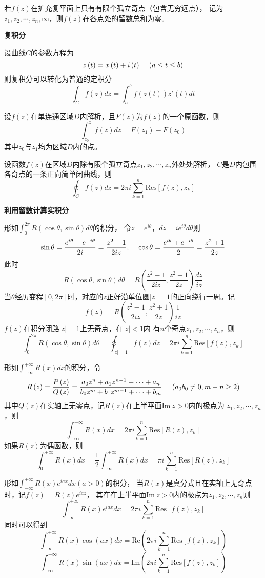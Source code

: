 \documentclass[a4paper,12pt]{article}
\begin{document}
若$f\left(z\right)$在扩充复平面上只有有限个孤立奇点（包含无穷远点），
记为$z_1,z_2,\cdots,z_n,\infty$，则$f\left(z\right)$在各点处的留数总和为零。

\noindent
\textbf{复积分}

设曲线$C$的参数方程为
$$
z\left(t\right)=x\left(t\right)+i\left(t\right)\kern 12pt\left(a\le t\le b\right)
$$
则复积分可以转化为普通的定积分
$$
\int_Cf\left(z\right)dz=\int_a^bf\left(z\left(t\right)\right)z'\left(t\right)dt
$$

设$f\left(z\right)$在单连通区域$D$内解析，且$F\left(z\right)$为$f\left(z\right)$的一个原函数，则
$$
\int_{z_0}^{z_1}f\left(z\right)dz=F\left(z_1\right)-F\left(z_0\right)
$$
其中$z_0$与$z_1$均为区域$D$内的点。

设函数$f\left(z\right)$在区域$D$内除有限个孤立奇点$z_1,z_2,\cdots,z_n$外处处解析，
$C$是$D$内包围各奇点的一条正向简单闭曲线，则
$$
\oint_Cf\left(z\right)dz=2\pi i\sum_{k=1}^n\text{Res}\left[f\left(z\right),z_k\right]
$$

\noindent
\textbf{利用留数计算实积分}

形如$\int_0^{2\pi}R\left(\cos\theta,\sin\theta\right)d\theta$的积分，
令$z=e^{i\theta}$，$dz=ie^{i\theta}d\theta$则
$$
\sin\theta=\frac{e^{i\theta}-e^{-i\theta}}{2i}=\frac{z^2-1}{2iz},\kern 12pt
\cos\theta=\frac{e^{i\theta}+e^{-i\theta}}{2}=\frac{z^2+1}{2z}
$$
此时
$$
R\left(\cos\theta,\sin\theta\right)d\theta=
R\left(\frac{z^2-1}{2iz},\frac{z^2+1}{2z}\right)\frac{dz}{iz}
$$
当$\theta$经历变程$\left[0,2\pi\right]$时，对应的$z$正好沿单位圆$\left|z\right|=1$的正向绕行一周。记
$$
f\left(z\right)=R\left(\frac{z^2-1}{2iz},\frac{z^2+1}{2z}\right)\frac1{iz}
$$
$f\left(z\right)$在积分闭路$\left|z\right|=1$上无奇点，在$\left|z\right|<1$内
有$n$个奇点$z_1,z_2,\cdots,z_n$，则
$$
\int_0^{2\pi}R\left(\cos\theta,\sin\theta\right)d\theta=
\oint_{\left|z\right|=1}f\left(z\right)dz=
2\pi i\sum_{k=1}^n\text{Res}\left[f\left(z\right),z_k\right]
$$

形如$\int_{-\infty}^{+\infty}R\left(x\right)dx$的积分，令
$$
R\left(z\right)=\frac{P\left(z\right)}{Q\left(z\right)}=
\frac{a_0z^n+a_1z^{n-1}+\cdots+a_n}{b_0z^m+b_1z^{m-1}+\cdots+b_m}
\kern 12pt \left(a_0b_0\ne0,m-n\ge2\right)
$$
其中$Q\left(z\right)$在实轴上无零点，记$R\left(z\right)$在上半平面$\text{Im}\ z>0$内的极点为
$z_1,z_2,\cdots,z_n$，则
$$
\int_{-\infty}^{+\infty}R\left(x\right)dx=2\pi i\sum_{k=1}^n\text{Res}\left[R\left(z\right),z_k\right]
$$
如果$R\left(z\right)$为偶函数，则
$$
\int_0^{+\infty}R\left(x\right)dx=\frac12\int_{-\infty}^{+\infty}R\left(x\right)dx
=\pi i\sum_{k=1}^n\text{Res}\left[R\left(z\right),z_k\right]
$$


形如$\int_{-\infty}^{+\infty}R\left(x\right)e^{iax}dx\left(a>0\right)$的积分，
当$R\left(x\right)$是真分式且在实轴上无奇点时，记$f\left(z\right)=R\left(z\right)e^{iaz}$，
其在在上半平面$\text{Im}\ z>0$内的极点为$z_1,z_2,\cdots,z_n$则
$$
\int_{-\infty}^{+\infty}R\left(x\right)e^{iax}dx=
2\pi i\sum_{k=1}^n\text{Res}\left[f\left(z\right),z_k\right]
$$
同时可以得到
$$
\int_{-\infty}^{+\infty}R\left(x\right)\cos\left(ax\right)dx=
\text{Re}\left(2\pi i\sum_{k=1}^n\text{Res}\left[f\left(z\right),z_k\right]\right)
$$
$$
\int_{-\infty}^{+\infty}R\left(x\right)\sin\left(ax\right)dx=
\text{Im}\left(2\pi i\sum_{k=1}^n\text{Res}\left[f\left(z\right),z_k\right]\right)
$$
\end{document}
